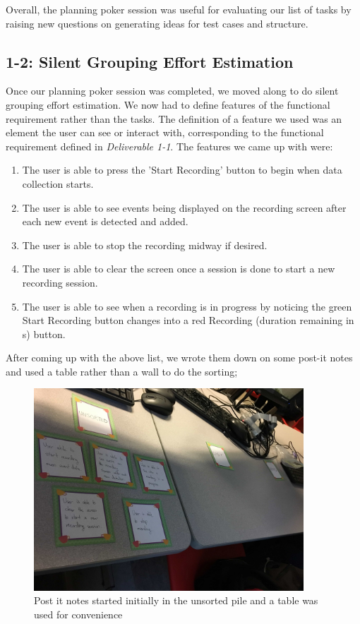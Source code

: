 \documentclass[11pt,a4paper]{article}
\begin{document}
Overall, the planning poker session was useful for evaluating our list of tasks by raising new questions on generating ideas for test cases and structure.


\subsection*{1-2: Silent Grouping Effort Estimation}

Once our planning poker session was completed, we moved along to do silent grouping effort estimation. We now had to define features of the functional requirement rather than the tasks. The definition of a feature we used was an element the user can see or interact with, corresponding to the functional requirement defined in \textit{Deliverable 1-1}. The features we came up with were:

\begin{enumerate}

\item The user is able to press the 'Start Recording' button to begin when data collection starts.
\item The user is able to see events being displayed on the recording screen after each new event is detected and added.
\item The user is able to stop the recording midway if desired.
\item The user is able to clear the screen once a session is done to start a new recording session.
\item The user is able to see when a recording is in progress by noticing the green Start Recording button changes into a red Recording (duration remaining in s) button.
\end{enumerate}

After coming up with the above list, we wrote them down on some post-it notes and used a table rather than a wall to do the sorting;

\begin{figure}[h]
\centering
	\includegraphics[width=0.9\textwidth]{silentimg1.png}
	\caption{Post it notes started initially in the unsorted pile and a table was used for convenience}
\end{figure}
\end{document}
